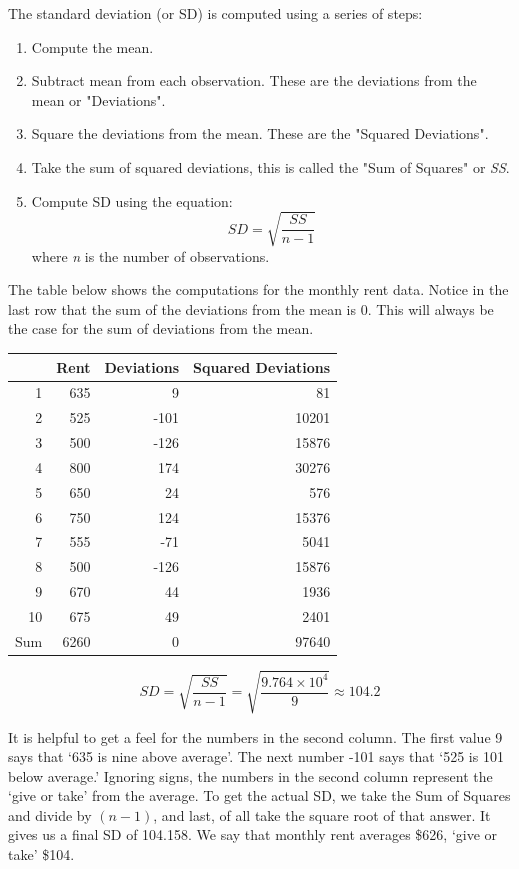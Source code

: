 \documentclass[11pt, chapterprefix=true]{scrbook}\usepackage[]{graphicx}\usepackage[]{color}
\begin{document}
The standard deviation (or SD) is computed using a series of steps:
\begin{enumerate}
\item Compute the mean.
\item Subtract mean from each observation. These are the deviations from the mean or "Deviations".
\item Square the deviations from the mean. These are the "Squared Deviations".
\item Take the sum of squared deviations, this is called the "Sum of Squares" or \textit{SS}.
\item Compute SD using the equation: $$SD=\sqrt{\frac{SS}{n-1}}$$ where \textit{n} is the number of observations.
\end{enumerate}

The table below shows the computations for the monthly rent data. Notice in the last row that the sum of the deviations from the mean is 0. This will always be the case for the sum of deviations from the mean.


\begin{table}[ht]
\centering
\begin{tabular}{rrrr}
  \hline
 & Rent & Deviations & Squared Deviations \\ 
  \hline
1 & 635 & 9 & 81 \\ 
  2 & 525 & -101 & 10201 \\ 
  3 & 500 & -126 & 15876 \\ 
  4 & 800 & 174 & 30276 \\ 
  5 & 650 & 24 & 576 \\ 
  6 & 750 & 124 & 15376 \\ 
  7 & 555 & -71 & 5041 \\ 
  8 & 500 & -126 & 15876 \\ 
  9 & 670 & 44 & 1936 \\ 
  10 & 675 & 49 & 2401 \\ 
  Sum & 6260 & 0 & 97640 \\ 
   \hline
\end{tabular}
\end{table}


$$ SD = \sqrt{ \frac{ SS}{n - 1}} = \sqrt{ \frac{ \ensuremath{9.764\times 10^{4}}}{9}} \approx 104.2 $$

It is helpful to get a feel for the numbers in the second column.  The first value 9 says that `635 is nine above average'.  The next number -101 says that `525 is 101 below average.'  Ignoring signs, the numbers in the second column represent the `give or take' from the average.  To get the actual SD, we take the Sum of Squares and divide by $(n - 1)$, and last, of all take the square root of that answer.  It gives us a final SD of 104.158.  We say that monthly rent averages \$626, `give or take' \$104.
\end{document}
